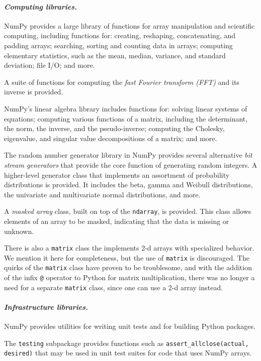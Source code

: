 \documentclass[fleqn,10pt]{wlscirep}
\newcommand{\code}[1]{\texttt{#1}}
\begin{document}
\paragraph{\emph{Computing libraries.}}
NumPy provides a large library of functions for array manipulation
and scientific computing, including functions for: creating, reshaping,
concatenating, and padding arrays; searching, sorting and counting data
in arrays; computing elementary statistics, such as the mean, median,
variance, and standard deviation; file I/O; and more.

A suite of functions for computing the \emph{fast Fourier transform (FFT)}
and its inverse is provided.

NumPy's linear algebra library includes functions for: solving linear
systems of equations; computing various functions of a matrix, including
the determinant, the norm, the inverse, and the pseudo-inverse;
computing the Cholesky, eigenvalue, and singular value decompositions of a matrix;
and more.

The random number generator library in NumPy provides several alternative
\emph{bit stream generators} that provide the core function of generating
random integers.
A higher-level generator class that implements an assortment of
probability distributions is provided. It includes the beta, gamma
and Weibull distributions, the univariate and multivariate normal
distributions, and more.

A \emph{masked array} class, built on top of the \code{ndarray}, is
provided.  This class allows elements of an array to be masked,
indicating that the data is missing or unknown.

There is also a \code{matrix} class the implements 2-d arrays with
specialized behavior.  We mention it here for completeness, but the
use of \code{matrix} is discouraged.  The quirks of the \code{matrix}
class have proven to be troublesome, and with the addition of the
infix \code{@} operator to Python for matrix multiplication, there was no
longer a need for a separate \code{matrix} class, since one can
use a 2-d array instead.

\paragraph{\emph{Infrastructure libraries.}} NumPy provides utilities
for writing unit tests and for building Python packages.

The \code{testing} subpackage provides functions such as
\code{assert\_allclose(actual, desired)} that may be used in unit
test suites for code that uses NumPy arrays.
\end{document}
